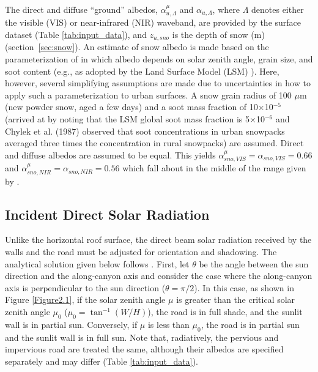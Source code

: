 \documentclass[12pt,authoryear]{elsarticle}
\numberwithin{equation}{section} %
\begin{document}
The direct and diffuse ``ground'' albedos, $\alpha_{u,\Lambda}^{\mu}$ and $\alpha_{u,\Lambda}$, where $\Lambda$ denotes either the visible (VIS) or near-infrared (NIR) waveband, are provided by the surface dataset (Table \ref{tab:input_data}), and $z_{u,sno}$ is the depth of snow (m) (section~\ref{sec:snow}). An estimate of snow albedo is made based on the parameterization of \citet{marshallPhysicalParameterizationSnow1989} in which albedo depends on solar zenith angle, grain size, and soot content (e.g., as adopted by the Land Surface Model (LSM) \citep{bonanLandSurfaceModel1996}). Here, however, several simplifying assumptions are made due to uncertainties in how to apply such a parameterization to urban surfaces. A snow grain radius of 100 $\mu$m (new powder snow, aged a few days) and a soot mass fraction of 10$\times$10$^{-5}$ (arrived at by noting that the LSM global soot mass fraction is 5$\times$10$^{-6}$ and Chylek et al. (1987) observed that soot concentrations in urban snowpacks averaged three times the concentration in rural snowpacks) are assumed. Direct and diffuse albedos are assumed to be equal. This yields $\alpha_{sno,VIS}^{\mu}=\alpha_{sno,VIS}=0.66$ and $\alpha_{sno,NIR}^{\mu}=\alpha_{sno,NIR}=0.56$ which fall about in the middle of the range given by \citet{okeBoundaryLayerClimates1987}.

\subsection{Incident Direct Solar Radiation}
%
Unlike the horizontal roof surface, the direct beam solar radiation received by the walls and the road must be adjusted for orientation and shadowing. The analytical
solution given below follows \citet{massonPhysicallyBasedSchemeUrban2000}. First, let $\theta$ be the angle between the sun direction and the along-canyon axis and consider the case where the along-canyon axis is perpendicular to the sun direction ($\theta=\pi/2$). In this case, as shown in Figure \ref{Figure2.1}, if the solar zenith angle $\mu$ is greater than the critical solar zenith angle $\mu_{0}$ ($\mu_{0}=\tan^{-1}(W/H)$), the road is in full shade, and the sunlit wall is in partial sun. Conversely, if $\mu$ is less than $\mu_{0}$, the road is in partial sun and the sunlit wall is in full sun. Note that, radiatively, the pervious and impervious road are treated the same, although their albedos are specified separately and may differ (Table \ref{tab:input_data}). 
\end{document}
